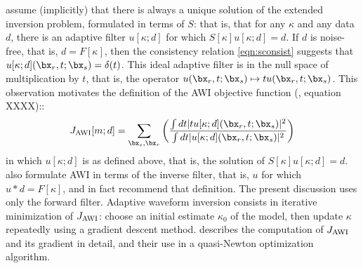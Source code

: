 

\cite{Warner:16} assume (implicitly) that there is always a unique
solution of the extended inversion problem, formulated in terms of
$S$: that is, that
for any $\kappa$ and any data $d$, there is an
adaptive filter $u[\kappa;d]$ for which
$S[\kappa]u[\kappa;d]= d$. If $d$ is noise-free, that is, $d=F[\kappa]$, then the consistency relation \ref{eqn:sconsist}
suggests that $u[\kappa;d](\bx_r,t;\bx_s) = \delta(t)$. This ideal adaptive filter is in the null
space of multiplication by $t$, that is, the operator
$u(\bx_r,t;\bx_s) \mapsto t u(\bx_r,t;\bx_s)$. This
observation motivates the definition of the AWI objective function
(\cite{Warner:16}, equation XXXX)::
\begin{equation}
  \label{eqn:awideforig}
  J_{\rm AWI}[m;d] = \sum_{\bx_s,\bx_r} \left(\frac{\int dt |tu[\kappa;d](\bx_r,t;\bx_s)|^2}{\int dt |u[\kappa;d](\bx_r,t;\bx_s)|^2}\right) 
\end{equation}
in which $u[\kappa;d]$ is as defined above, that is, the solution of $S[\kappa]u[\kappa;d]
= d$. \cite{Warner:16} also formulate
AWI in terms of the inverse filter, that is, $u$ for which
$u*d = F[\kappa]$, and in fact recommend that definition. The present
discussion uses only the forward filter.
Adaptive waveform inversion consists in iterative minimization of
$J_{\rm AWI}$: choose an initial estimate $\kappa_0$ of the
model, then update $\kappa$ repeatedly using a gradient
descent method. \cite{Warner:16} describes the computation of $J_{\rm AWI}$
and its gradient in detail, and their use in a quasi-Newton
optimization algorithm.

